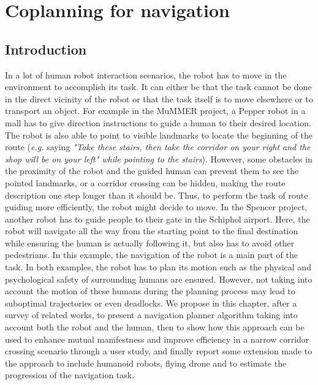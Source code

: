 \documentclass[a4paper,11pt,twoside]{StyleThese}
\begin{document}
\setcounter{chapter}{1} %
\dominitoc
\faketableofcontents
\fi

\chapter{Coplanning for navigation}
\label{chapter:navigation}
\minitoc

\section{Introduction}
In a lot of human robot interaction scenarios, the robot has to move in the environment to accomplish its task. It can either be that the task cannot be done in the direct vicinity of the robot or that the task itself is to move elsewhere or to transport an object. For example in the MuMMER project, a Pepper robot in a mall has to give direction instructions to guide a human to their desired location. The robot is also able to point to visible landmarks to locate the beginning of the route (\textit{e.g.} saying \textit{"Take these stairs, then take the corridor on your right and the shop will be on your left" while pointing to the stairs}). However, some obstacles in the proximity of the robot and the guided human can prevent them to see the pointed landmarks, or a corridor crossing can be hidden, making the route description one step longer than it should be. Thus, to perform the task of route guiding more efficiently, the robot might decide to move.
In the Spencer project, another robot has to guide people to their gate in the Schiphol airport. Here, the robot will navigate all the way from the starting point to the final destination while ensuring the human is actually following it, but also has to avoid other pedestrians. In this example, the navigation of the robot is a main part of the task.
In both examples, the robot has to plan its motion such as the physical and psychological safety of surrounding humans are ensured. However, not taking into account the motion of these humans during the planning process may lead to suboptimal trajectories or even deadlocks.
We propose in this chapter, after a survey of related works, to present a navigation planner algorithm taking into account both the robot and the human, then to show how this approach can be used to enhance mutual manifestness and improve efficiency in a narrow corridor crossing scenario through a user study, and finally report some extension made to the approach to include humanoid robots, flying drone and to estimate the progression of the navigation task. 
\end{document}
